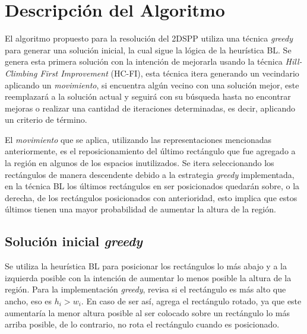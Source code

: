 \documentclass[letter, 10pt]{article}
\begin{document}
\section{Descripci\'on del Algoritmo}

El algoritmo propuesto para la resoluci\'on del 2DSPP utiliza una t\'ecnica \emph{greedy} para generar una soluci\'on inicial, la cual sigue la l\'ogica de la heur\'istica BL. Se genera esta primera soluci\'on con la intenci\'on de mejorarla usando la t\'ecnica \emph{Hill-Climbing First Improvement} (HC-FI), esta t\'ecnica itera generando un vecindario aplicando un \emph{movimiento}, si encuentra alg\'un vecino con una soluci\'on mejor, este reemplazar\'a a la soluci\'on actual y seguir\'a con su b\'usqueda hasta no encontrar mejoras o realizar una cantidad de iteraciones determinadas, es decir, aplicando un criterio de t\'ermino.

El \emph{movimiento} que se aplica, utilizando las representaciones mencionadas anteriormente, es el reposicionamiento del \'ultimo rect\'angulo que fue agregado a la regi\'on en algunos de los espacios inutilizados. Se itera seleccionando los rect\'angulos de manera descendente debido a la estrategia \emph{greedy} implementada, en la t\'ecnica BL los \'ultimos rect\'angulos en ser posicionados quedar\'an sobre, o la derecha, de los rect\'angulos posicionados con anterioridad, esto implica que estos \'ultimos tienen una mayor probabilidad de aumentar la altura de la regi\'on.

\subsection{Soluci\'on inicial \emph{greedy}}

Se utiliza la heur\'istica BL para posicionar los rect\'angulos lo m\'as abajo y a la izquierda posible con la intenci\'on de aumentar lo menos posible la altura de la regi\'on. Para la implementaci\'on \emph{greedy}, revisa si el rect\'angulo es m\'as alto que ancho, eso es $h_i > w_i$. En caso de ser as\'i, agrega el rect\'angulo rotado, ya que este aumentar\'ia la menor altura posible al ser colocado sobre un rect\'angulo lo m\'as arriba posible, de lo contrario, no rota el rect\'angulo cuando es posicionado.
\vspace{0.2cm}
\end{document}

